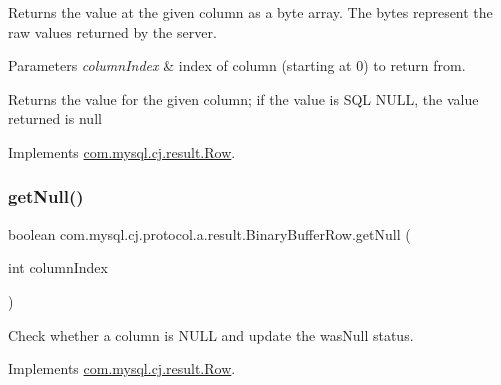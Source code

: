 Returns the value at the given column as a byte array. The bytes represent the raw values returned by the server.


\begin{DoxyParams}{Parameters}
{\em column\+Index} & index of column (starting at 0) to return from. \\
\hline
\end{DoxyParams}
\begin{DoxyReturn}{Returns}
the value for the given column; if the value is S\+QL {\ttfamily N\+U\+LL}, the value returned is {\ttfamily null} 
\end{DoxyReturn}


Implements \mbox{\hyperlink{interfacecom_1_1mysql_1_1cj_1_1result_1_1_row_a063918cd10fe7c3ef5df95b33e21f19e}{com.\+mysql.\+cj.\+result.\+Row}}.

\mbox{\label{classcom_1_1mysql_1_1cj_1_1protocol_1_1a_1_1result_1_1_binary_buffer_row_af16fb029bdd91774e95d8ee502a85e07}} 
\subsubsection{\texorpdfstring{get\+Null()}{getNull()}}
{\footnotesize\ttfamily boolean com.\+mysql.\+cj.\+protocol.\+a.\+result.\+Binary\+Buffer\+Row.\+get\+Null (\begin{DoxyParamCaption}\item[{int}]{column\+Index }\end{DoxyParamCaption})}

Check whether a column is N\+U\+LL and update the \textquotesingle{}was\+Null\textquotesingle{} status. 

Implements \mbox{\hyperlink{interfacecom_1_1mysql_1_1cj_1_1result_1_1_row_aaf07357d53c30067dfa87183a1e60a18}{com.\+mysql.\+cj.\+result.\+Row}}.

\mbox{\label{classcom_1_1mysql_1_1cj_1_1protocol_1_1a_1_1result_1_1_binary_buffer_row_ab30b2392287e18d1a0d7662a3090493a}} 
